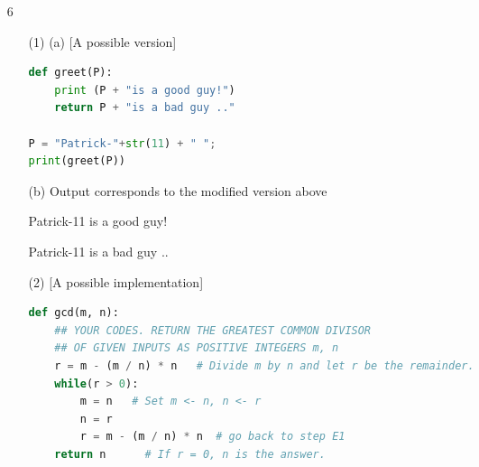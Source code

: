\documentclass[11pt]{amsart}
\begin{document}
\begin{itemize}
\item [6]
\begin{itemize}
\item [(1)] (a) [A possible version]
\begin{lstlisting}[language=Python]
def greet(P):
	print (P + "is a good guy!")
	return P + "is a bad guy .."

P = "Patrick-"+str(11) + " ";
print(greet(P))
\end{lstlisting}
 
 (b) Output corresponds to the modified version above
 
 Patrick-11 is a good guy!
 
 Patrick-11 is a bad guy ..
 
 \item [(2)] [A possible implementation]
 \begin{lstlisting}[language=Python]
def gcd(m, n):
	## YOUR CODES. RETURN THE GREATEST COMMON DIVISOR 
	## OF GIVEN INPUTS AS POSITIVE INTEGERS m, n
	r = m - (m / n) * n   # Divide m by n and let r be the remainder.
	while(r > 0):
		m = n   # Set m <- n, n <- r
		n = r   
		r = m - (m / n) * n  # go back to step E1
	return n      # If r = 0, n is the answer.

\end{lstlisting}
 
\end{itemize}





\end{itemize}
\end{document}
